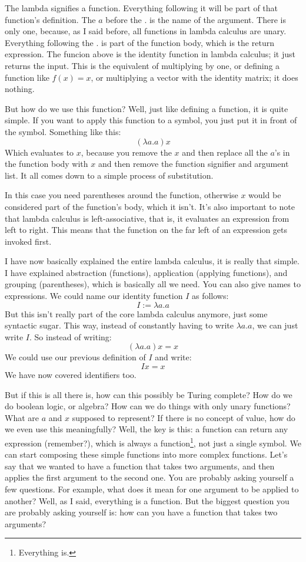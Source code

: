 \documentclass[11pt]{book}
\begin{document}
The lambda signifies a function. Everything following it will be part of that
function's definition. The \(a\) before the \(.\) is the name of the argument.
There is only one, because, as I said before, all functions in lambda calculus
are unary. Everything following the \(.\) is part of the function body, which
is the return expression. The funcion above is the identity function in lambda
calculus; it just returns the input. This is the equivalent of multiplying by
one, or defining a function like \(f(x)=x\), or multiplying a vector with the
identity matrix; it does nothing.

But how do we use this function? Well, just like defining a function, it is
quite simple. If you want to apply this function to a symbol, you just put it
in front of the symbol. Something like this:
\[(\lambda a.a)x\]
Which evaluates to \(x\), because you remove the \(x\) and then replace all the
\(a\)'s in the function body with \(x\) and then remove the function signifier
and argument list. It all comes down to a simple process of substitution.

In this case you need parentheses around the function, otherwise \(x\) would be
considered part of the function's body, which it isn't. It's also important to
note that lambda calculus is left-associative, that is, it evaluates an
expression from left to right. This means that the function on the far left of
an expression gets invoked first.

I have now basically explained the entire lambda calculus, it is really that
simple. I have explained abstraction (functions), application (applying
functions), and grouping (parentheses), which is basically all we need. You
can also give names to expressions. We could name our identity function \(I\)
as follows: \[I:=\lambda a.a\] But this isn't really part of the core lambda
calculus anymore, just some syntactic sugar. This way, instead of constantly
having to write \(\lambda a.a\), we can just write \(I\). So instead of
writing: \[(\lambda a.a)x=x\] We could use our previous definition of \(I\) and
write: \[Ix=x\] We have now covered identifiers too.

But if this is all there is, how can this possibly be Turing complete? How do
we do boolean logic, or algebra? How can we do things with only unary
functions? What are \(a\) and \(x\) supposed to represent? If there is no
concept of value, how do we even use this meaningfully? Well, the key is this:
a function can return any expression (remember?), which is always a
function\footnote{Everything is.}, not just a single symbol. We can start
composing these simple functions into more complex functions. Let's say that we
wanted to have a function that takes two arguments, and then applies the first
argument to the second one. You are probably asking yourself a few questions.
For example, what does it mean for one argument to be applied to another? Well,
as I said, everything is a function. But the biggest question you are probably
asking yourself is: how can you have a function that takes two arguments?
\end{document}

